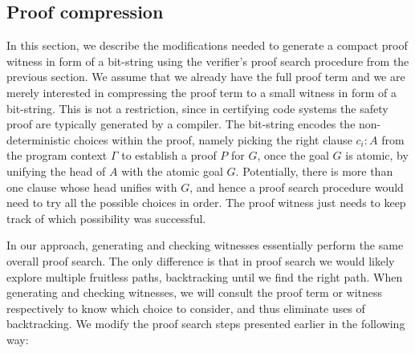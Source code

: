 \documentclass{llncs}
\begin{document}
\subsection{Proof compression}
In this section, we describe the modifications needed to generate
a compact proof witness in form of a bit-string using the verifier's
proof search procedure from the previous section. 
We assume that we already have the full proof term and we are merely
interested in compressing the proof term to a small witness in form of
a bit-string. This is not a restriction, since in certifying code
systems the safety proof are typically generated by a compiler. 
The bit-string encodes the non-deterministic choices within the proof,
namely picking the right clause $c_i{:}A$ from the program context
$\Gamma$ to establish a proof $P$ for $G$, once the goal $G$ is
atomic, by unifying the head of $A$ with the atomic goal
$G$. Potentially, there is more than one clause whose head unifies
with $G$, and hence a proof search procedure would need to try all the
possible choices in order. The proof witness just needs to keep track
of which possibility was successful.


In our approach, generating and checking witnesses essentially perform
the same overall proof search. The only difference is that in proof
search we would likely explore multiple fruitless paths,
backtracking until we find the right path. When generating and
checking witnesses, we will consult the proof term or witness
respectively to know which choice to consider, and thus eliminate uses
of backtracking.  We modify the proof search steps presented earlier
in the following way:
\end{document}
